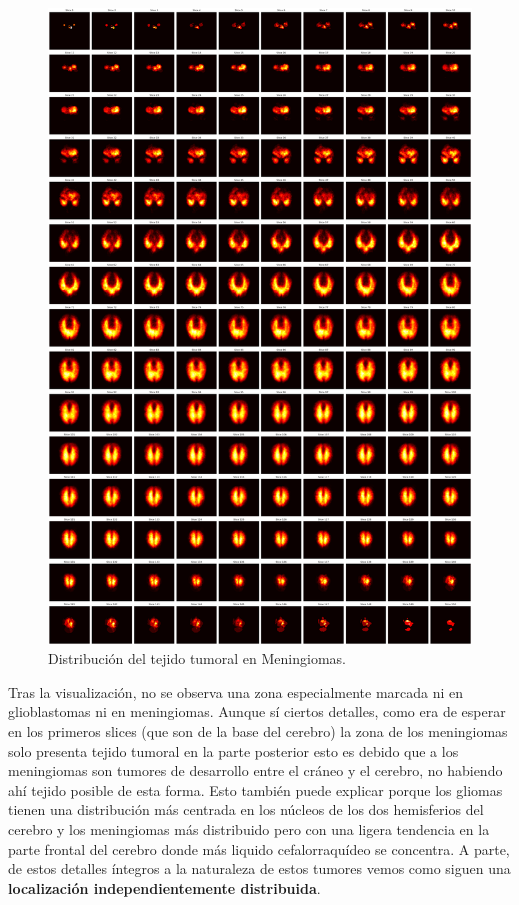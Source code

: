 \begin{figure}[!h]
	\centering
	\includegraphics[width=1.0\linewidth]{imagenes/metodologia_heatmapsMEN.png}
	\caption{Distribución del tejido tumoral en Meningiomas.}
\end{figure}


Tras la visualización, no se observa una zona especialmente marcada ni en glioblastomas ni en meningiomas. Aunque sí ciertos detalles, como era de esperar en los primeros slices (que son de la base del cerebro) la zona de los meningiomas solo presenta tejido tumoral en la parte posterior esto es debido que a los meningiomas son tumores de desarrollo entre el cráneo y el cerebro, no habiendo ahí tejido posible de esta forma. Esto también puede explicar porque los gliomas tienen una distribución más centrada en los núcleos de los dos hemisferios del cerebro y los meningiomas más distribuido pero con una ligera tendencia en la parte frontal del cerebro donde más liquido cefalorraquídeo se concentra. A parte, de estos detalles íntegros a la naturaleza de estos tumores vemos como siguen una \textbf{localización independientemente distribuida}. 


